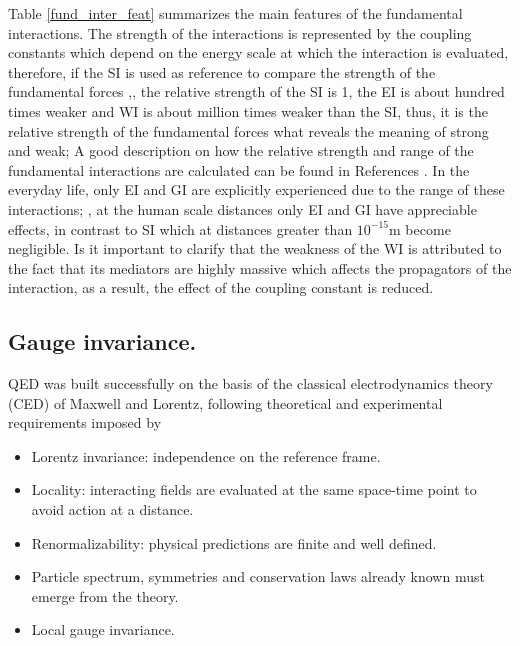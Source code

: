 Table \ref{fund_inter_feat} summarizes the main features of the fundamental interactions. The strength of the interactions is represented by the coupling constants which depend on the energy scale at which the interaction is evaluated, therefore, if the SI is used as reference to compare the strength of the fundamental forces ,\ie, the relative strength of the SI is 1, the EI is about hundred times weaker and WI is about million times weaker than the SI, thus, it is the relative strength of the fundamental forces what reveals the meaning of strong and weak; A good description on how the relative strength and range of the fundamental interactions are calculated can be found in References \cite{hyperphys,matt}. In the everyday life, only EI and GI are explicitly experienced due to the range of these interactions; \ie, at the human scale distances only EI and GI have appreciable effects, in contrast to SI which at distances greater than $10^{-15}$m become negligible. Is it important to clarify that the weakness of the WI is attributed to the fact that its mediators are highly massive which affects the propagators of the interaction, as a result, the effect of the coupling constant is reduced.                        

\subsection{Gauge invariance.}
QED was built successfully on the basis of the classical electrodynamics theory (CED) of Maxwell and Lorentz, following theoretical and experimental requirements imposed by

\begin{itemize}
\item Lorentz invariance: independence on the reference frame.  
\item Locality: interacting fields are evaluated at the same space-time point to avoid action at a distance. 
\item Renormalizability: physical predictions are finite and well defined. 
\item Particle spectrum, symmetries and conservation laws already known must emerge from the theory.
\item Local gauge invariance.
\end{itemize}

